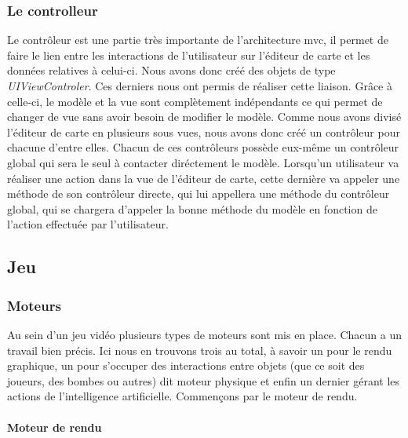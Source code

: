 			
	\subsubsection{Le controlleur}
		
		Le contrôleur est une partie très importante de l'architecture \gls{mvc}, il permet de faire le lien entre les interactions de l'utilisateur sur l'éditeur de carte et les données relatives à celui-ci. Nous avons  donc créé des objets de type \textit{UIViewControler}. Ces derniers nous ont permis de réaliser cette liaison. Grâce à celle-ci, le modèle et la vue sont complètement indépendants ce qui permet de changer de vue sans avoir besoin de modifier le modèle. Comme nous avons divisé l'éditeur de carte en plusieurs sous vues, nous avons donc créé un contrôleur pour chacune d'entre elles. Chacun de ces contrôleurs possède eux-même un contrôleur global qui sera le seul à contacter diréctement le modèle. Lorsqu'un utilisateur va réaliser une action dans la vue de l'éditeur de carte, cette dernière va appeler une méthode de son contrôleur directe, qui lui appellera une méthode du contrôleur global, qui se chargera d'appeler la bonne méthode du modèle en fonction de l'action effectuée par l'utilisateur. 



\subsection{Jeu}

	\subsubsection{Moteurs}
	
		Au sein d'un jeu vidéo plusieurs types de moteurs sont mis en place.
		Chacun a un travail bien précis.
		Ici nous en trouvons trois au total, à savoir un pour le rendu graphique, un
		pour s'occuper des interactions entre objets (que ce soit des joueurs, des bombes ou autres) dit moteur physique et enfin un dernier gérant
		les actions de l'intelligence artificielle.
		Commençons par le moteur de rendu.
	
		\paragraph{Moteur de rendu\\}
		
			\hypertarget{Moteur de rendu}{}
			\label{Moteur de rendu}
		
